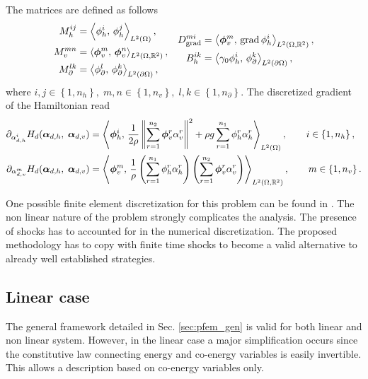 The matrices are defined as follows 
\begin{equation}
\begin{aligned}
M_h^{ij} &= \inner[L^2(\Omega)]{\phi_h^i}{\phi_h^j}, \\
M_v^{mn} &= \inner[L^2(\Omega, \mathbb{R}^2)]{\bm\phi_v^m}{\bm\phi_v^n}, \\
M_\partial^{lk} &= \inner[L^2(\partial\Omega)]{\phi_\partial^l}{\phi_\partial^k},
\end{aligned}\quad
\begin{aligned}
{D}_{\grad}^{mi} &= \inner[L^2(\Omega, \mathbb{R}^2)]{\bm\phi_v^m}{\grad \phi_h^i}, \\
{B}_{h}^{ik} &= \inner[L^2(\partial\Omega)]{\gamma_0 \phi_h^i}{\phi_\partial^k}, \\
\end{aligned}
\end{equation}
where $i, j \in \left\{1, n_h\right\}, \; m,n \in \left\{1, n_v\right\}, \; l, k \in \left\{1, n_\partial \right\}$. 
The discretized gradient of the Hamiltonian read
\begin{equation}
\begin{aligned}
\partial_{{\alpha}_{d, h}^i} H_d(\bm{\alpha}_{d, h},\; \bm{\alpha}_{d, v}) &= \inner[L^2(\Omega)]{\bm\phi_h^i}{\frac{1}{2 \rho} \norm{\sum_{r=1}^{n_2} \bm{\phi}_v^r \alpha_v^r}^2 + \rho g \sum_{r=1}^{n_1} {\phi}_h^r \alpha_h^r}, \qquad i \in \left\{1, n_h\right\}, \\
\partial_{{\alpha}_{d, v}^m} H_d(\bm{\alpha}_{d, h},\; \bm{\alpha}_{d, v}) &= \inner[L^2(\Omega, \mathbb{R}^2)]{\bm\phi_v^m}{\frac{1}{\rho} \left(\sum_{r=1}^{n_1} {\phi}_h^r \alpha_h^r\right) \left(\sum_{r=1}^{n_2} \bm{\phi}_v^r \alpha_v^r \right)}, \qquad m \in \left\{1, n_v\right\}.
\end{aligned}
\end{equation}

One possible finite element discretization for this problem can be found in \cite{pironneau1989finite}. The non linear nature of the problem strongly complicates the analysis. The presence of shocks has to accounted for in the numerical discretization. The proposed methodology has to copy with finite time shocks to become a valid alternative to already well established strategies.


\subsection{Linear case}\label{sec:linearPfem}
The general framework detailed in Sec. \ref{sec:pfem_gen} is valid for both linear and non linear system. However, in the linear case a major simplification occurs since the constitutive law connecting energy and co-energy variables is easily invertible. This allows a description based on co-energy variables only. \\

